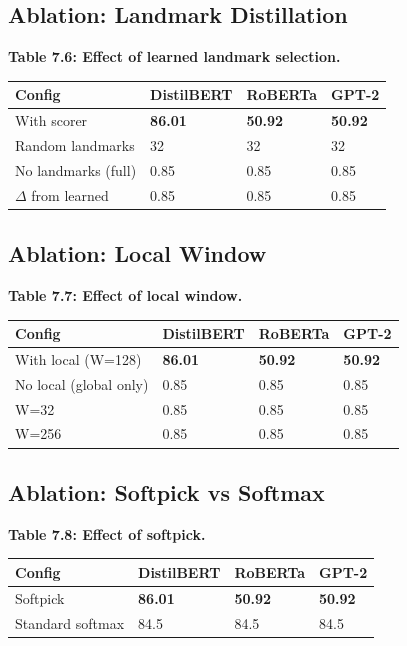 \subsection{Ablation: Landmark Distillation}

\textbf{Table 7.6: Effect of learned landmark selection.}

\begin{table}[H]
\centering
\small
\begin{tabular}{llll}
\toprule
\textbf{Config} & \textbf{DistilBERT} & \textbf{RoBERTa} & \textbf{GPT-2} \\
\midrule
With scorer & \textbf{86.01} & \textbf{50.92} & \textbf{50.92} \\
Random landmarks & 32 & 32 & 32 \\
No landmarks (full) & 0.85 & 0.85 & 0.85 \\
$\Delta$ from learned & 0.85 & 0.85 & 0.85 \\
\bottomrule
\end{tabular}
\end{table}

\subsection{Ablation: Local Window}

\textbf{Table 7.7: Effect of local window.}

\begin{table}[H]
\centering
\small
\begin{tabular}{llll}
\toprule
\textbf{Config} & \textbf{DistilBERT} & \textbf{RoBERTa} & \textbf{GPT-2} \\
\midrule
With local (W=128) & \textbf{86.01} & \textbf{50.92} & \textbf{50.92} \\
No local (global only) & 0.85 & 0.85 & 0.85 \\
W=32 & 0.85 & 0.85 & 0.85 \\
W=256 & 0.85 & 0.85 & 0.85 \\
\bottomrule
\end{tabular}
\end{table}

\subsection{Ablation: Softpick vs Softmax}

\textbf{Table 7.8: Effect of softpick.}

\begin{table}[H]
\centering
\small
\begin{tabular}{llll}
\toprule
\textbf{Config} & \textbf{DistilBERT} & \textbf{RoBERTa} & \textbf{GPT-2} \\
\midrule
Softpick & \textbf{86.01} & \textbf{50.92} & \textbf{50.92} \\
Standard softmax & 84.5 & 84.5 & 84.5 \\
\bottomrule
\end{tabular}
\end{table}

